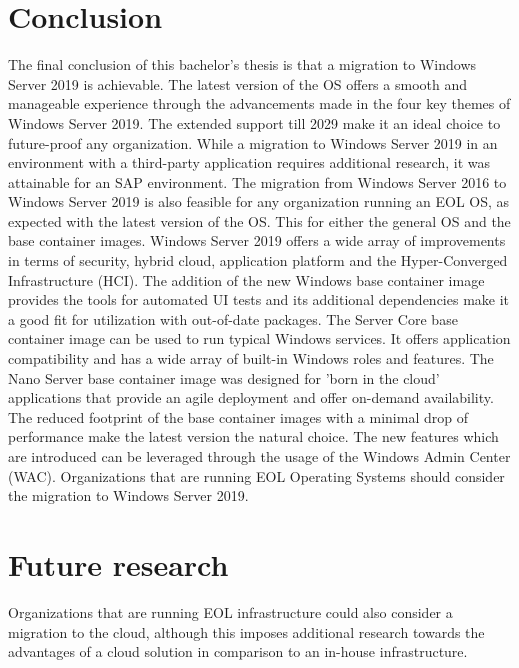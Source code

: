 \documentclass[a0,portrait]{a0poster}
\begin{document}
\begin{multicols}{2}
\section*{Conclusion}
\color{black}
The final conclusion of this bachelor's thesis is that a migration to Windows Server 2019 is achievable.
The latest version of the OS offers a smooth and manageable experience through the advancements made in the four key themes of Windows Server 2019. 
The extended support till 2029 make it an ideal choice to future-proof any organization. 
While a migration to Windows Server 2019 in an environment with a third-party application requires additional research, it was attainable for an SAP environment. 
The migration from Windows Server 2016 to Windows Server 2019 is also feasible for any organization running an EOL OS, as expected with the latest version of the OS.
This for either the general OS and the base container images.
Windows Server 2019 offers a wide array of improvements in terms of security, hybrid cloud, application platform and the Hyper-Converged Infrastructure (HCI).
The addition of the new Windows base container image provides the tools for automated UI tests and its additional dependencies make it a good fit for utilization with out-of-date packages. 
The Server Core base container image can be used to run typical Windows services. 
It offers application compatibility and has a wide array of built-in Windows roles and features. 
The Nano Server base container image was designed for 'born in the cloud' applications that provide an agile deployment and offer on-demand availability. 
The reduced footprint of the base container images with a minimal drop of performance make the latest version the natural choice. 
The new features which are introduced can be leveraged through the usage of the Windows Admin Center (WAC).
Organizations that are running EOL Operating Systems should consider the migration to Windows Server 2019.

\color{HoGentAccent1} 
\section*{Future research}
\color{black}
Organizations that are running EOL infrastructure could also consider a migration to the cloud, although this imposes additional research towards the advantages of a cloud solution in comparison to an in-house infrastructure.




\end{multicols}
\end{document}
